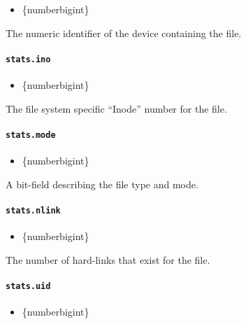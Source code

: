 \begin{itemize}
\tightlist
\item
  \{number\textbar bigint\}
\end{itemize}

The numeric identifier of the device containing the file.

\paragraph{\texorpdfstring{\texttt{stats.ino}}{stats.ino}}\label{stats.ino}

\begin{itemize}
\tightlist
\item
  \{number\textbar bigint\}
\end{itemize}

The file system specific ``Inode'' number for the file.

\paragraph{\texorpdfstring{\texttt{stats.mode}}{stats.mode}}\label{stats.mode}

\begin{itemize}
\tightlist
\item
  \{number\textbar bigint\}
\end{itemize}

A bit-field describing the file type and mode.

\paragraph{\texorpdfstring{\texttt{stats.nlink}}{stats.nlink}}\label{stats.nlink}

\begin{itemize}
\tightlist
\item
  \{number\textbar bigint\}
\end{itemize}

The number of hard-links that exist for the file.

\paragraph{\texorpdfstring{\texttt{stats.uid}}{stats.uid}}\label{stats.uid}

\begin{itemize}
\tightlist
\item
  \{number\textbar bigint\}
\end{itemize}


